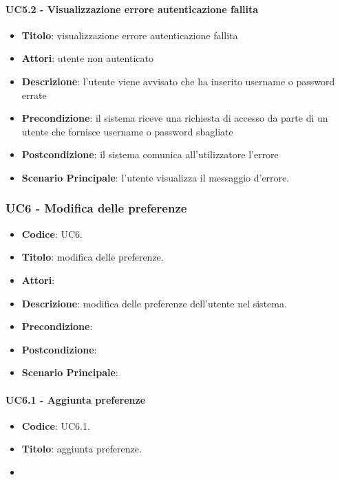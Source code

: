 	\paragraph{UC5.2 - Visualizzazione errore autenticazione fallita}
		\begin{itemize}
			\item \textbf{Titolo}: visualizzazione errore autenticazione fallita
			\item \textbf{Attori}: utente non autenticato
			\item \textbf{Descrizione}: l'utente viene avvisato che ha inserito username o password errate
			\item \textbf{Precondizione}: il sistema riceve una richiesta di accesso da parte di un utente che
			fornisce username o password sbagliate
			\item \textbf{Postcondizione}: il sistema comunica all'utilizzatore l'errore
			\item \textbf{Scenario Principale}: l'utente visualizza il messaggio d'errore.
		\end{itemize}



\subsubsection{UC6 - Modifica delle preferenze}
	\begin{itemize}
		\item \textbf{Codice}: UC6.
		\item \textbf{Titolo}: modifica delle preferenze.
		\item \textbf{Attori}: 
		\item \textbf{Descrizione}: modifica delle preferenze dell'utente nel sistema.
		\item \textbf{Precondizione}: 
		\item \textbf{Postcondizione}: 
		\item \textbf{Scenario Principale}:
	\end{itemize}



	\paragraph{UC6.1 - Aggiunta preferenze}
	\begin{itemize}
		\item \textbf{Codice}: UC6.1.
		\item \textbf{Titolo}: aggiunta preferenze.
		\item 
	\end{itemize}
	
